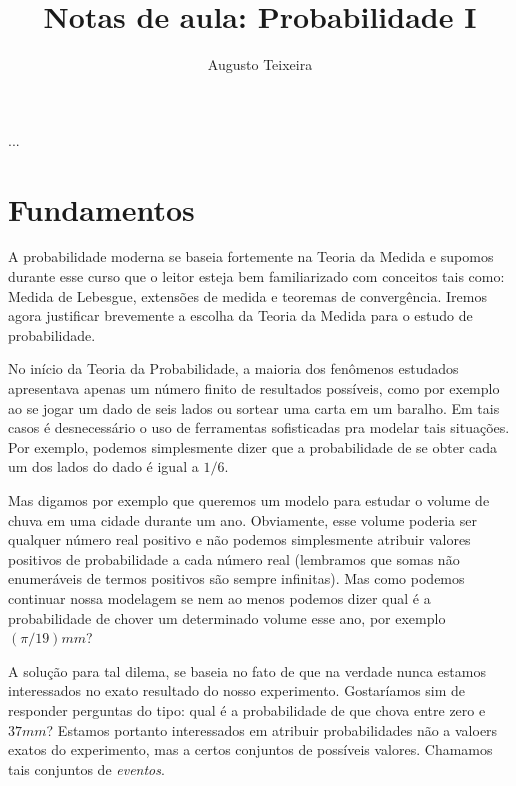 \documentclass[reqno, draft]{book}
\newcommand*\1{\mathds{1}}
\begin{document}
\title{Notas de aula: Probabilidade I}
\author{Augusto Teixeira}

\frontmatter

\maketitle

\mbox{}
\thispagestyle{empty}

\newpage

\setcounter{page}{1}

...

\newpage

\thispagestyle{empty}

\tableofcontents

\mainmatter

\chapter{Fundamentos}

A probabilidade moderna se baseia fortemente na Teoria da Medida e supomos durante esse curso que o leitor esteja bem familiarizado com conceitos tais como: Medida de Lebesgue, extensões de medida e teoremas de convergência.
Iremos agora justificar brevemente a escolha da Teoria da Medida para o estudo de probabilidade.

No início da Teoria da Probabilidade, a maioria dos fenômenos estudados apresentava apenas um número finito de resultados possíveis, como por exemplo ao se jogar um dado de seis lados ou sortear uma carta em um baralho.
Em tais casos é desnecessário o uso de ferramentas sofisticadas pra modelar tais situações.
Por exemplo, podemos simplesmente dizer que a probabilidade de se obter cada um dos lados do dado é igual a $1/6$.

Mas digamos por exemplo que queremos um modelo para estudar o volume de chuva em uma cidade durante um ano.
Obviamente, esse volume poderia ser qualquer número real positivo e não podemos simplesmente atribuir valores positivos de probabilidade a cada número real (lembramos que somas não enumeráveis de termos positivos são sempre infinitas).
Mas como podemos continuar nossa modelagem se nem ao menos podemos dizer qual é a probabilidade de chover um determinado volume esse ano, por exemplo $(\pi/19)mm$?

A solução para tal dilema, se baseia no fato de que na verdade nunca estamos interessados no exato resultado do nosso experimento.
Gostaríamos sim de responder perguntas do tipo: qual é a probabilidade de que chova entre zero e $37mm$?
Estamos portanto interessados em atribuir probabilidades não a valoers exatos do experimento, mas a certos conjuntos de possíveis valores.
Chamamos tais conjuntos de \emph{eventos}. 
\end{document}
